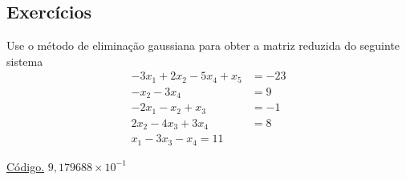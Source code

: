\subsection*{Exercícios}

\begin{exer}\label{exer:egauss_exec}
  Use o método de eliminação gaussiana para obter a matriz reduzida do seguinte sistema
  \begin{align}
    -3x_1 + 2x_2 -5x_4 + x_5 &= -23\\
    -x_2 -3x_4 &= 9\\
    -2x_1 -x_2 + x_3 &= -1\\
    2x_2 - 4x_3 + 3x_4 &= 8\\
    x_1 - 3x_3 - x_4 = 11
  \end{align}
\end{exer}
\begin{resp}
    \ifisoctave 
  \href{https://github.com/phkonzen/notas/blob/master/src/MatematicaNumerica/cap_sl_direto/dados/exer_egauss_reduzida/exer_egauss_reduzida.m}{Código.} 
  \fi
  $9,179688\times 10^{-1}$
\end{resp}

\emconstrucao